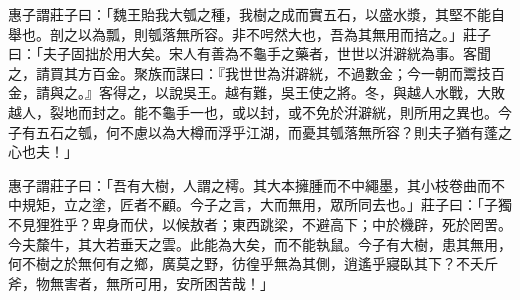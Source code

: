 \begin{pinyinscope}
惠子謂莊子曰：「魏王貽我大瓠之種，我樹之成而實五石，以盛水漿，其堅不能自舉也。剖之以為瓢，則瓠落無所容。非不呺然大也，吾為其無用而掊之。」莊子曰：「夫子固拙於用大矣。宋人有善為不龜手之藥者，世世以洴澼絖為事。客聞之，請買其方百金。聚族而謀曰：『我世世為洴澼絖，不過數金；今一朝而鬻技百金，請與之。』客得之，以說吳王。越有難，吳王使之將。冬，與越人水戰，大敗越人，裂地而封之。能不龜手一也，或以封，或不免於洴澼絖，則所用之異也。今子有五石之瓠，何不慮以為大樽而浮乎江湖，而憂其瓠落無所容？則夫子猶有蓬之心也夫！」

惠子謂莊子曰：「吾有大樹，人謂之樗。其大本擁腫而不中繩墨，其小枝卷曲而不中規矩，立之塗，匠者不顧。今子之言，大而無用，眾所同去也。」莊子曰：「子獨不見狸狌乎？卑身而伏，以候敖者；東西跳梁，不避高下；中於機辟，死於罔罟。今夫斄牛，其大若垂天之雲。此能為大矣，而不能執鼠。今子有大樹，患其無用，何不樹之於無何有之鄉，廣莫之野，彷徨乎無為其側，逍遙乎寢臥其下？不夭斤斧，物無害者，無所可用，安所困苦哉！」


\end{pinyinscope}